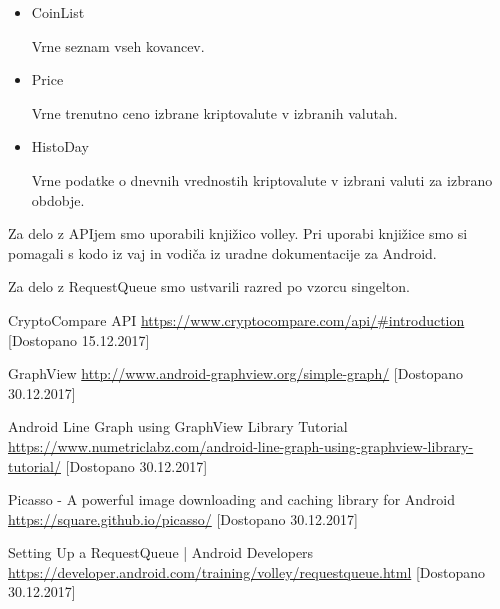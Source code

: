\documentclass[11pt,a4paper]{article}
\begin{document}
\begin{itemize}
\item CoinList

Vrne seznam vseh kovancev.

\item Price

Vrne trenutno ceno izbrane kriptovalute v izbranih valutah.

\item HistoDay

Vrne podatke o dnevnih vrednostih kriptovalute v izbrani valuti za izbrano obdobje.
\end{itemize}

Za delo z APIjem smo uporabili knjižico volley. Pri uporabi knjižice smo si 
pomagali s kodo iz vaj in vodiča iz uradne dokumentacije za Android\cite{volley}.

Za delo z RequestQueue smo ustvarili razred po vzorcu singelton.


\begin{thebibliography}{9}
	
	CryptoCompare API
	\url{https://www.cryptocompare.com/api/#introduction}
	[Dostopano 15.12.2017]
	
	GraphView
	\url{http://www.android-graphview.org/simple-graph/}
	[Dostopano 30.12.2017]
	
	Android Line Graph using GraphView Library Tutorial
	\url{https://www.numetriclabz.com/android-line-graph-using-graphview-library-tutorial/}
	[Dostopano 30.12.2017]
	
	Picasso - A powerful image downloading and caching library for Android
	\url{https://square.github.io/picasso/}
	[Dostopano 30.12.2017]
	
	Setting Up a RequestQueue | Android Developers
	\url{https://developer.android.com/training/volley/requestqueue.html}
	[Dostopano 30.12.2017]
	
\end{thebibliography}
\end{document}
